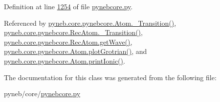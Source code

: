 Definition at line \hyperlink{pynebcore_8py_source_l01254}{1254} of file \hyperlink{pynebcore_8py_source}{pynebcore.\-py}.



Referenced by \hyperlink{pynebcore_8py_source_l01433}{pyneb.\-core.\-pynebcore.\-Atom.\-\_\-\-Transition()}, \hyperlink{pynebcore_8py_source_l02812}{pyneb.\-core.\-pynebcore.\-Rec\-Atom.\-\_\-\-Transition()}, \hyperlink{pynebcore_8py_source_l02699}{pyneb.\-core.\-pynebcore.\-Rec\-Atom.\-get\-Wave()}, \hyperlink{pynebcore_8py_source_l02443}{pyneb.\-core.\-pynebcore.\-Atom.\-plot\-Grotrian()}, and \hyperlink{pynebcore_8py_source_l02233}{pyneb.\-core.\-pynebcore.\-Atom.\-print\-Ionic()}.



The documentation for this class was generated from the following file\-:\begin{DoxyCompactItemize}
\item 
pyneb/core/\hyperlink{pynebcore_8py}{pynebcore.\-py}\end{DoxyCompactItemize}
